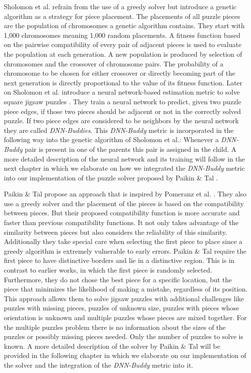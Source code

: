 \documentclass[11pt]{report}
\begin{document}
Sholomon et al. \cite{sholomon2013genetic} refrain from the use of a greedy
solver but introduce a genetic algorithm as a strategy for piece placement. The
placements of all puzzle pieces are the population of chromosomes a genetic
algorithm contains. They start with 1,000 chromosomes meaning 1,000 random
placements. A fitness function based on the pairwise compatibility of every pair
of adjacent pieces is used to evaluate the population at each generation. A new
population is produced by selection of chromosomes and the crossover of
chromosome pairs. The probability of a chromosome to be chosen for either
crossover or directly becoming part of the next generation is directly
proportional to the value of its fitness function. Later on Sholomon et al.
introduce a neural network-based estimation metric to solve square jigsaw
puzzles \cite{sholomon2016dnn}. They train a neural network to predict, given
two puzzle piece edges, if those two pieces should be adjacent or not in the
correctly solved puzzle. If two piece edges are considered to be neighbors by
the neural network they are called \textit{DNN-Buddies}. This \textit{DNN-Buddy}
metric is incorporated in the following way into the genetic algorithm of
Sholomon et al.: Whenever a \textit{DNN-Buddy} pair is present in one of the
parents this pair is assigned in the child. A more detailed description of the
neural network and its training will follow in the next chapter in which we
elaborate on how we integrated the \textit{DNN-Buddy} metric into our
implementation of the puzzle solver proposed by Paikin \& Tal \cite{Paikin2015}.

Paikin \& Tal \cite{Paikin2015} propose an approach that is inspired by Pomeranz
et al. \cite{Pomeranz2011}. They also use a greedy solver and the placement of
the pieces is based on the compatibility between pieces. But their proposed
compatibility function is more accurate and faster than previous compatibility
functions. It not only takes advantage of the similarity between pieces but also
considers the reliability of this similarity. Additionally they take special
care when selecting the first piece to place since a greedy algorithm is
extremely vulnerable to early errors. Paikin \& Tal require the first piece to
have distinctive borders and lie in a distinctive region. This is in contrast to
earlier works, in which the first piece is randomly selected. Furthermore, they
do not chose the best piece for a specific location, but the piece that
minimizes the likelihood of making a mistake, regardless of its position. This
approach allows them to solve jigsaw puzzles with additional challenges like
puzzles with missing pieces, puzzles of unknown size, puzzles with pieces whose
orientation is unknown and multiple puzzles whose pieces are mixed together. For
the multiple puzzles problem there is no information about the sizes of the
puzzles or possibly missing pieces needed. Only the number of puzzles to solve
is known. A more detailed description of the solver by Paikin \& Tal will be
provided in the following chapter in which we elaborate on our implementation of
the solver and the integration of the \textit{DNN-Buddy} metric into it. 
\end{document}
